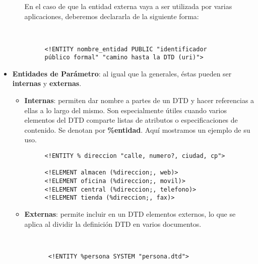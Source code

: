 \begin{itemize}
\begin{itemize}
     En el caso de que la entidad externa vaya a ser utilizada por varias aplicaciones, deberemos declararla de la siguiente forma:

         \begin{figure}[H]
         \begin{tcolorbox}[sharp corners, colback=yellow!30, colframe=white!20]
             \scriptsize
             \begin{verbatim}


<!ENTITY nombre_entidad PUBLIC "identificador público formal" "camino hasta la DTD (uri)">
             \end{verbatim}
         \end{tcolorbox}
     \end{figure}
     \end{itemize}

    \item \textbf{Entidades de Parámetro}: al igual que la generales, éstas pueden ser \textbf{internas} y \textbf{externas}.

    \begin{itemize}
        \item \textbf{Internas}: permiten dar nombre a partes de un DTD y hacer referencias a ellas a lo largo del mismo. Son especialmente útiles cuando varios elementos del DTD comparte listas de atributos o especificaciones de contenido. Se denotan por \textbf{\%entidad}. Aquí mostramos un ejemplo de su uso.

        \begin{figure}[h]
            \begin{tcolorbox}[sharp corners, colback=yellow!30, colframe=white!20]
                \scriptsize
                \begin{verbatim}
<!ENTITY % direccion "calle, numero?, ciudad, cp">

<!ELEMENT almacen (%direccion;, web)>
<!ELEMENT oficina (%direccion;, movil)>
<!ELEMENT central (%direccion;, telefono)>
<!ELEMENT tienda (%direccion;, fax)>
                \end{verbatim}
            \end{tcolorbox}
        \end{figure}

    \item \textbf{Externas}: permite incluir en un DTD elementos externos, lo que se aplica al dividir la definición DTD en varios documentos.

            \begin{figure}[h]
        \begin{tcolorbox}[sharp corners, colback=yellow!30, colframe=white!20]
            \scriptsize
            \begin{verbatim}


 <!ENTITY %persona SYSTEM "persona.dtd">
            \end{verbatim}
        \end{tcolorbox}
    \end{figure}
    \end{itemize}
\end{itemize}

